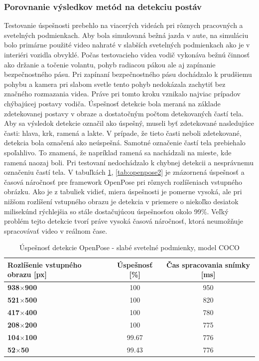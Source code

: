 \documentclass[slovak,master,dept460,male,cpp,cpdeclaration]{diploma}
\begin{document}
\subsubsection*{Porovnanie výsledkov metód na detekciu postáv}
\label{sec:compare}
Testovanie úspešnosti  prebehlo na viacerých videách pri rôznych  pracovných a svetelných  podmienkach. Aby bola simulovaná bežná  jazda v aute, na simuláciu bolo primárne použité video nahraté v slabších  svetelných podmienkach ako je v interiéri vozidla obvyklé. Počas testovacieho videa  vodič vykonáva bežnú činnosť ako držanie a točenie volantu, pohyb radiacou pákou ale aj zapínanie  bezpečnostného pásu. Pri zapínaní bezpečnostného pásu dochádzalo k prudšiemu pohybu a  kamera pri slabom svetle tento pohyb nedokázala  zachytiť bez  značného rozmazania videa. Práve pri tomto  kroku vznikalo najviac  prípadov chýbajúcej postavy vodiča. Úspešnosť detekcie bola meraná na základe zdetekovanej postavy v obraze a dostatočným počtom detekovaných častí tela. Aby sa výsledok detekcie označil ako úspešný, museli byť zdetekované nasledujúce časti: hlava, krk, ramená a lakte. V prípade, že tieto časti neboli zdetekované,  detekcia bola označená ako  neúspešná. Samotné označenie  častí tela prebiehalo spoľahlivo. To znamená, že napríklad ramená sa nachádzali na mieste, kde ramená naozaj boli. Pri testovaní nedochádzalo k chybnej  detekcii a nesprávnemu označeniu častí tela. V  tabuľkách \ref{tab:openpose1}, \ref{tab:openpose2} je znázornená úspešnosť a časová náročnosť pre framework OpenPose pri rôznych rozlíšeniach vstupného obrázku. Ako je z tabuliek vidieť, miera úspešnosti je pomerne vysoká, ale pri nižšom rozlíšení vstupného obrazu je detekcia v priemere o niekoľko desiatok milisekúnd  rýchlejšia  so stále dostačujúcou úspešnosťou okolo 99\%. Veľký problém tejto detekcie tvorí práve vysoká časová náročnosť, ktorá  neumožňuje spracovávať video v reálnom čase.

\begin{table}[H]
\begin{tabular}{|l|c|c|}
\hline
\textbf{Rozlíšenie vstupného obrazu [px]}        & \textbf{Úspešnosť [\%]}  & \textbf{Čas spracovania snímky [ms]} \\ \hline
\textbf{938$\times$900}      &   100           &   950        \\ \hline
\textbf{521$\times$500}      &   100           &   820        \\ \hline
\textbf{417$\times$400}      &   100           &   780        \\ \hline
\textbf{208$\times$200}      &   100           &   775        \\ \hline
\textbf{104$\times$100}      &   99.67         &   776        \\ \hline
\textbf{52$\times$50}       &   99.43          &   776        \\ \hline
\end{tabular}

	\caption{Úspešnosť detekcie OpenPose - slabé svetelné podmienky,  model COCO}
	\label{tab:openpose1}
\end{table}
\end{document}
